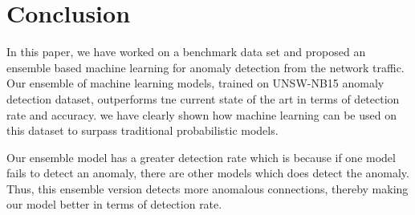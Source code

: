 \documentclass[14pt, conference]{IEEEtran}
\begin{document}

\section{Conclusion}
\label{conclusion}

In this paper, we have  worked on a benchmark data set and proposed  an ensemble based machine learning for anomaly detection from the network traffic. Our ensemble of machine learning models, trained on UNSW-NB15 anomaly detection dataset, outperforms tne current  state of the art in terms of detection rate and accuracy. we have clearly shown how machine learning can be used on this dataset to surpass traditional probabilistic models. 


Our ensemble model has a greater detection rate which is because if one model fails to detect an anomaly, there are other models which does detect the anomaly. Thus, this ensemble version detects more anomalous connections, thereby making our model better in terms of detection rate. 




 
\end{document}
